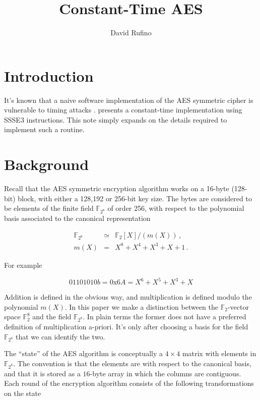 \documentclass[a4paper]{article}
\numberwithin{equation}{section}
\begin{document}
\title{Constant-Time AES}
\author{David Rufino}
\newcommand{\nn}{\nonumber}
\newcommand{\mbbF}{\mathbb{F}}
\setlength{\parindent}{0pt}
\maketitle

\section{Introduction}

It's known that a naive software implementation of the AES symmetric cipher \cite{NISTAES} is vulnerable to timing attacks \cite{bernstein2005cache}. \cite{Hamburg2009AES} presents a constant-time implementation using SSSE3 instructions. This note simply expands on the details required to implement such a routine. 

\section{Background}

Recall that the AES symmetric encryption algorithm works on a  16-byte (128-bit) block, with either a 128,192 or 256-bit key size. The bytes are considered to be elements of the finite field $\mathbb{F}_{2^8}$ of order 256, with respect to the polynomial basis associated to the canonical representation

\begin{eqnarray}
\label{aespoly}
	 \mbbF_{2^8} &\simeq& \mbbF_2\left[ X \right] / \left( m(X) \right) \, , \nn \\
          m(X) &=& X^8 + X^4 + X^3 + X + 1 \, . 
\end{eqnarray}

For example

	$$ 01101010 b =  0\text{x}6A = X^6 + X^5 + X^3 + X $$

Addition is defined in the obvious way, and multiplication is defined modulo the polynomial $m(X)$. In this paper we make a distinction between the $\mbbF_2$-vector space $\mbbF_{2}^8$ and the field $\mbbF_{2^8}$. In plain terms the former does not have a preferred definition of multiplication a-priori. It's only after choosing a basis for the field $\mbbF_{2^8}$ that we can identify the two.

The ``state'' of the AES algorithm is conceptually a $4 \times 4$ matrix with elements in $\mbbF_{2^8}$. The convention is that the elements are with respect to the canonical basis, and that it is stored as a $16$-byte array in which the columns are contiguous. Each round of the encryption algorithm consists of the following transformations on the state
\end{document}
